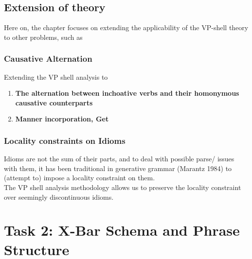\documentclass[11pt,a4paper]{article}
\begin{document}
	\subsection{Extension of theory}
	Here on, the chapter focuses on extending the applicability of the VP-shell theory to other problems, such as
	\subsubsection{Causative Alternation}
	Extending the VP shell analysis to\\
	\begin{enumerate}
		\item \textbf{The alternation between inchoative verbs and their homonymous causative counterparts}
		\item \textbf{Manner incorporation, Get}
	\end{enumerate}
	\subsubsection{Locality constraints on Idioms}
	Idioms are not the sum of their parts, and to deal with possible parse/ issues with them, it has been 
	traditional in generative grammar (Marantz 1984) to (attempt to) impose a locality constraint on them.\\
	$ $\\
	The VP shell analysis methodology allows us to preserve the locality constraint over seemingly discontinuous
	idioms.
	$ $\\
	$ $\\
	$ $\\
	$ $\\
	\section{Task 2: X-Bar Schema and Phrase Structure}
	
\end{document}
